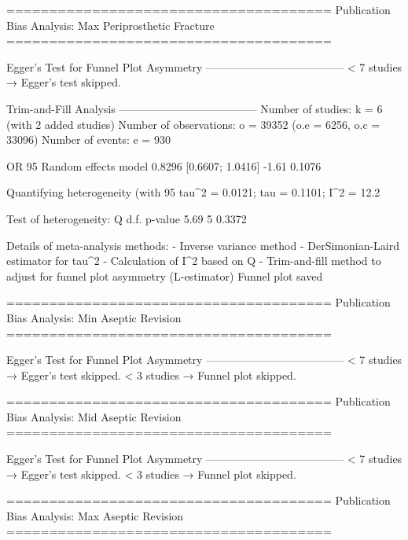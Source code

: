 ======================================
Publication Bias Analysis: Max Periprosthetic Fracture 
======================================
                                                                                                                                                          
Egger's Test for Funnel Plot Asymmetry
--------------------------------------
  < 7 studies → Egger’s test skipped.

Trim-and-Fill Analysis
--------------------------------------
Number of studies: k = 6 (with 2 added studies)
Number of observations: o = 39352 (o.e = 6256, o.c = 33096)
Number of events: e = 930

                         OR           95%
Random effects model 0.8296 [0.6607; 1.0416] -1.61  0.1076

Quantifying heterogeneity (with 95%
 tau^2 = 0.0121; tau = 0.1101; I^2 = 12.2%

Test of heterogeneity:
    Q d.f. p-value
 5.69    5  0.3372

Details of meta-analysis methods:
- Inverse variance method
- DerSimonian-Laird estimator for tau^2
- Calculation of I^2 based on Q
- Trim-and-fill method to adjust for funnel plot asymmetry (L-estimator)
  Funnel plot saved

======================================
Publication Bias Analysis: Min Aseptic Revision 
======================================
                                                                                                                                                          
Egger's Test for Funnel Plot Asymmetry
--------------------------------------
  < 7 studies → Egger’s test skipped.
  < 3 studies → Funnel plot skipped.

======================================
Publication Bias Analysis: Mid Aseptic Revision 
======================================
                                                                                                                                                          
Egger's Test for Funnel Plot Asymmetry
--------------------------------------
  < 7 studies → Egger’s test skipped.
  < 3 studies → Funnel plot skipped.

======================================
Publication Bias Analysis: Max Aseptic Revision 
======================================
                                                                                                                                                          
